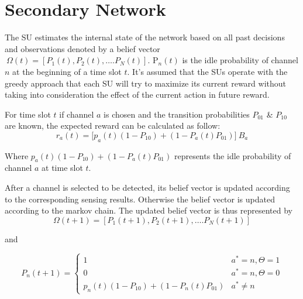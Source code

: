 \documentclass[twocolumn]{el-author}
\begin{document}
\section{Secondary Network}

The SU estimates the internal state of the network based on all past decisions and observations denoted by a belief vector  ${\ }{\Omega }\left({t}\right)=\left[P_1\left(t\right),P_2\left(t\right),\dots .P_N\left(t\right)\right]$. P${}_{n}(t)$ is the idle probability of channel $n$ at the beginning of a time slot $t$.	It's assumed that the SUs operate with the greedy approach that each SU will try to maximize its current reward without taking into consideration the effect of the current action in future reward.
	

For time slot $t$ if channel $a$ is chosen and the transition probabilities ${P}_{01}$ \& ${P}_{10}$ are known, the expected reward can be calculated as follow:
\begin{equation}\label{9}
r_a(t)={[p}_a\left(t\right)\left(1-P_{10}\right)+\left(1-P_a\left(t\right)P_{01}\right)]\ B_a
\end{equation}
	

Where ${p}_a\left(t\right)\left(1-P_{10}\right)+\left(1-P_a\left(t\right)P_{01}\right)$ represents the idle probability of channel $a$ at time slot $t$.

After a channel is selected to be detected, its belief vector is updated according to the corresponding sensing results. Otherwise the belief vector is updated according to the markov chain. The updated belief vector is thus represented by 
\begin{equation}\label{11}
{\Omega }\left({t+1}\right)=\left[P_1\left(t+1\right),P_2\left(t+1\right),\dots .P_N\left(t+1\right)\right]
\end{equation}
	
and 
	
\begin{equation}\label{12}
P_n(t+1)=
\begin{cases}
1 & a^*=n, \Theta=1
\\
0 &  a^*=n, \Theta=0
\\
p_n(t)(1-P_{10})+(1-P_n(t)P_{01}) & a^*\neq n
\end{cases}
\end{equation}
	
\end{document}
